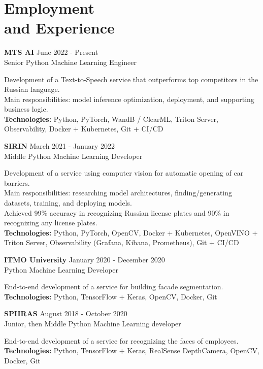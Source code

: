 \section{\sc Employment \\and Experience}
\vspace{2.6pt}

\textbf{MTS AI} \hfill June 2022 - Present \\
Senior Python Machine Learning Engineer

Development of a Text-to-Speech service that outperforms top competitors in the Russian language. \\
Main responsibilities: model inference optimization, deployment, and supporting business logic. \\
\textbf{Technologies:} Python, PyTorch, WandB / ClearML, Triton Server, Observability, Docker + Kubernetes, Git + CI/CD

\textbf{SIRIN} \hfill March 2021 - January 2022 \\
Middle Python Machine Learning Developer

Development of a service using computer vision for automatic opening of car barriers. \\
Main responsibilities: researching model architectures, finding/generating datasets, training, and deploying models. \\
Achieved 99\% accuracy in recognizing Russian license plates and 90\% in recognizing any license plates. \\
\textbf{Technologies:} Python, PyTorch, OpenCV, Docker + Kubernetes, OpenVINO + Triton Server, Observability (Grafana, Kibana, Prometheus), Git + CI/CD

\textbf{ITMO University} \hfill January 2020 - December 2020 \\
Python Machine Learning Developer

End-to-end development of a service for building facade segmentation. \\
\textbf{Technologies:} Python, TensorFlow + Keras, OpenCV, Docker, Git

\textbf{SPIIRAS} \hfill August 2018 - October 2020 \\
Junior, then Middle Python Machine Learning developer

End-to-end development of a service for recognizing the faces of employees. \\
\textbf{Technologies:} Python, TensorFlow + Keras, RealSense DepthCamera, OpenCV, Docker, Git

\endinput
